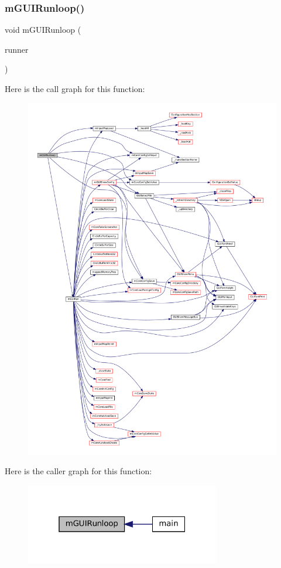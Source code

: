 \subsubsection{\texorpdfstring{m\+G\+U\+I\+Runloop()}{mGUIRunloop()}}
{\footnotesize\ttfamily void m\+G\+U\+I\+Runloop (\begin{DoxyParamCaption}\item[{struct \mbox{\hyperlink{structm_g_u_i_runner}{m\+G\+U\+I\+Runner}} $\ast$}]{runner }\end{DoxyParamCaption})}

Here is the call graph for this function\+:
\nopagebreak
\begin{figure}[H]
\begin{center}
\leavevmode
\includegraphics[width=350pt]{gui-runner_8c_a18b60d93179a62db9bb8c6b0fde56138_cgraph}
\end{center}
\end{figure}
Here is the caller graph for this function\+:
\nopagebreak
\begin{figure}[H]
\begin{center}
\leavevmode
\includegraphics[width=241pt]{gui-runner_8c_a18b60d93179a62db9bb8c6b0fde56138_icgraph}
\end{center}
\end{figure}
